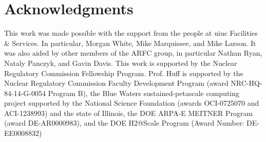 \section{Acknowledgments}
This work was made possible with the support from the people at \gls{uiuc}
Facilities \& Services. In particular, Morgan White, Mike Marquissee, and Mike
Larson. It was also aided by other members of the \gls{ARFC} group, in
particular Nathan Ryan, Nataly Panczyk, and Gavin Davis.
This work is supported by the Nuclear Regulatory Commission Fellowship Program.
Prof. Huff is supported by the Nuclear Regulatory Commission Faculty
Development Program (award NRC-HQ-84-14-G-0054 Program B), the Blue Waters
sustained-petascale computing project supported by the National Science
Foundation (awards OCI-0725070 and ACI-1238993) and the state of Illinois, the
DOE ARPA-E MEITNER Program (award DE-AR0000983), and the DOE H2@Scale Program
(Award Number: DE-EE0008832)
